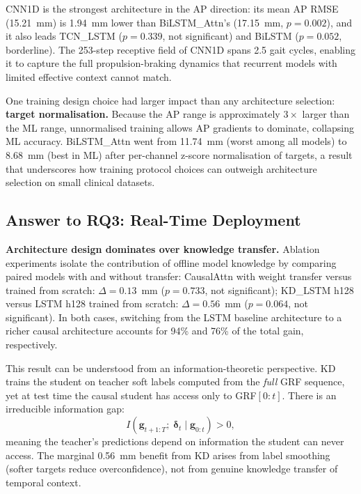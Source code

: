 \documentclass[preprint,12pt]{elsarticle}
\begin{document}
CNN1D is the strongest architecture in the AP direction: its mean AP RMSE
(15.21~mm) is 1.94~mm lower than BiLSTM\_Attn's (17.15~mm, $p = 0.002$),
and it also leads TCN\_LSTM ($p = 0.339$, not significant) and BiLSTM
($p = 0.052$, borderline).
The 253-step receptive field of CNN1D spans 2.5 gait cycles, enabling it to
capture the full propulsion-braking dynamics that recurrent models with limited
effective context cannot match.

One training design choice had larger impact than any architecture selection:
\textbf{target normalisation.}
Because the AP range is approximately $3\times$ larger than the ML range,
unnormalised training allows AP gradients to dominate, collapsing ML accuracy.
BiLSTM\_Attn went from 11.74~mm (worst among all models) to 8.68~mm (best in ML)
after per-channel z-score normalisation of targets, a result that underscores how
training protocol choices can outweigh architecture selection on small clinical
datasets.

\subsection{Answer to RQ3: Real-Time Deployment}
\label{subsec:disc_rt}

\textbf{Architecture design dominates over knowledge transfer.}
Ablation experiments isolate the contribution of offline model knowledge by
comparing paired models with and without transfer:
CausalAttn with weight transfer versus trained from scratch: $\Delta = 0.13$~mm
($p = 0.733$, not significant);
KD\_LSTM h128 versus LSTM h128 trained from scratch: $\Delta = 0.56$~mm
($p = 0.064$, not significant).
In both cases, switching from the LSTM baseline architecture to a richer causal
architecture accounts for 94\% and 76\% of the total gain, respectively.

This result can be understood from an information-theoretic perspective.
KD trains the student on teacher soft labels computed from the \emph{full} GRF
sequence, yet at test time the causal student has access only to GRF$[0{:}t]$.
There is an irreducible information gap:
\begin{equation}
  I\!\left(\mathbf{g}_{t{+}1:T};\;\boldsymbol{\delta}_t \mid \mathbf{g}_{0:t}\right) > 0,
\end{equation}
meaning the teacher's predictions depend on information the student can never
access.
The marginal 0.56~mm benefit from KD arises from label smoothing (softer targets
reduce overconfidence), not from genuine knowledge transfer of temporal context.
\end{document}
